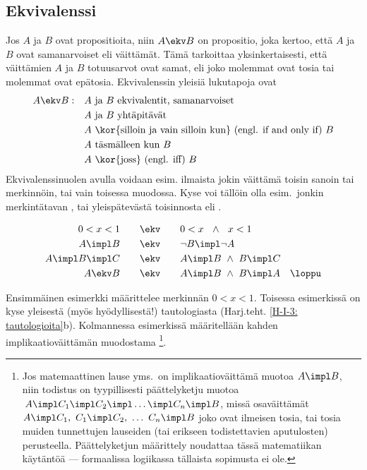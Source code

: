 \subsection{Ekvivalenssi}
%
 
Jos $A$ ja $B$ ovat propositioita, niin $A \ekv B$ on propositio, joka kertoo, että $A$ ja $B$ 
ovat samanarvoiset eli  väittämät. Tämä tarkoittaa yksinkertaisesti, että
väittämien $A$ ja $B$ totuusarvot ovat samat, eli joko molemmat ovat tosia tai molemmat ovat 
epätosia. Ekvivalenssin yleisiä lukutapoja ovat
\begin{align*}
A \ekv B: \quad &\text{$A$ ja $B$ ekvivalentit, samanarvoiset} \\
                &\text{$A$ ja $B$ yhtäpitävät} \\
                &\text{$A$ \kor{silloin ja vain silloin kun} (engl. if and only if) $B$} \\
                &\text{$A$ täsmälleen kun $B$} \\
                &\text{$A$ \kor{joss} (engl. iff) $B$}
\end{align*} 
Ekvivalenssinuolen avulla voidaan esim. ilmaista jokin väittämä toisin sanoin tai merkinnöin, 
tai vain toisessa muodossa. Kyse voi tällöin olla esim.\ jonkin merkintätavan 
, tai yleispätevästä toisinnosta eli
. 
\begin{Exa} \label{ekvivalensseja}
\begin{align*}
0< x < 1 \quad\quad          &\ekv \quad\quad 0 < x\ \ \wedge\ \ x < 1 \\
A \impl B \quad\quad         &\ekv \quad\quad \neg B \impl \neg A \\
A \impl B \impl C \quad\quad &\ekv \quad\quad A \impl B\ \wedge\ B \impl C \\
A \ekv B \quad\quad          &\ekv \quad\quad A \impl B\ \wedge\ B \impl A \quad \loppu
\end{align*} \end{Exa}
Ensimmäinen esimerkki määrittelee merkinnän $0<x<1$. Toisessa esimerkissä on kyse yleisestä 
(myös hyödyllisestä!) tautologiasta (Harj.teht. \ref{H-I-3: tautologioita}b). Kolmannessa 
esimerkissä määritellään kahden implikaatioväittämän muodostama 
%
\footnote[2]{Jos matemaattinen lause yms.\ on implikaatioväittämä muotoa 
$A \impl B$, niin todistus on tyypillisesti päättelyketju muotoa
$\,A \impl C_1 \impl C_2 \impl \ldots \impl C_n \impl B$, missä osaväittämät
$A \impl C_1,\ C_1 \impl C_2,\ \ldots\ C_n \impl B$ joko ovat ilmeisen tosia, tai tosia muiden 
tunnettujen lauseiden (tai erikseen todistettavien aputulosten) perusteella. Päättelyketjun
määrittely noudattaa tässä matematiikan käytäntöä --- formaalissa logiikassa tällaista
sopimusta ei ole.}. 
